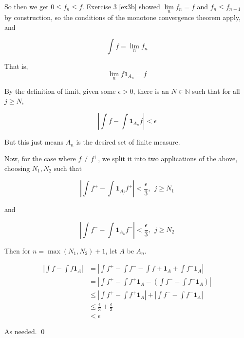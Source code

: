 \documentclass[11pt,oneside]{article}
\numberwithin{equation}{section}
\theoremstyle{definition}
\newtheorem{exercise}{Exercise}
\def\NN{\mathbb{N}}
\def\limn{\lim \limits _n}
\def\one{\mathbf{1}}
\begin{document}
\begin{solution}
\begin{enumerate}[(a)]
    So then we get $ 0 \leq f_n \leq f$.  Exercise 3 \ref{ex3b} showed
    $\limn f_n = f$ and $f_n \leq f_{n+1}$ by construction, so the
    conditions of the monotone convergence theorem apply, and

    \[
    \int f = \limn f_n
    \]

    That is,
    \[
    \limn f \one _{A_n} = f
    \]

    By the definition of limit, given some $\epsilon > 0$, there is an $N \in \NN$ such that
    for all $j \geq N$,

    \[
    | \int f - \int \one_{A_n} f | < \epsilon
    \]

    But this just means $A_n$ is the desired set of finite measure.

    Now, for the case where $f \neq f^+$, we split it into two applications of the above,
    choosing $N_1, N_2$ such that

    \[
    | \int f^+ - \int \one_{A_j} f^+ | < \frac{\epsilon}{3}, \ \ j \geq N_1
    \]

    and
    
    \[
    | \int f^- - \int \one_{A_k} f^- | < \frac{\epsilon}{3}, \ \ j \geq N_2
    \]

    Then for $n = \max(N_1, N_2) + 1$, let $A$ be $A_n$.  
    
    \begin{align*}
      | \int f - \int f \one _ A | &= | \int f^+ - \int f^- - \int f+ \one_A + \int f^- \one_A | \\
       &= | \int f^+ - \int f^+ \one_A - (\int f^- - \int f^- \one_A) | \\
      & \leq | \int f^+ - \int f^+ \one_A|  + | \int f^- - \int f^- \one_A | \\
      & \leq \frac{\epsilon}{3} +  \frac{\epsilon}{3} \\
      & < \epsilon
    \end{align*}

    As needed.  \qed
    
\end{enumerate}
  
  
  
\end{solution}


\begin{comment}
\begin{exercise}
  problem
\end{exercise}
\begin{solution}
\begin{enumerate}[(a)]
\item
  first answer
\end{enumerate}
\end{solution}
\end{comment}
\end{document}
